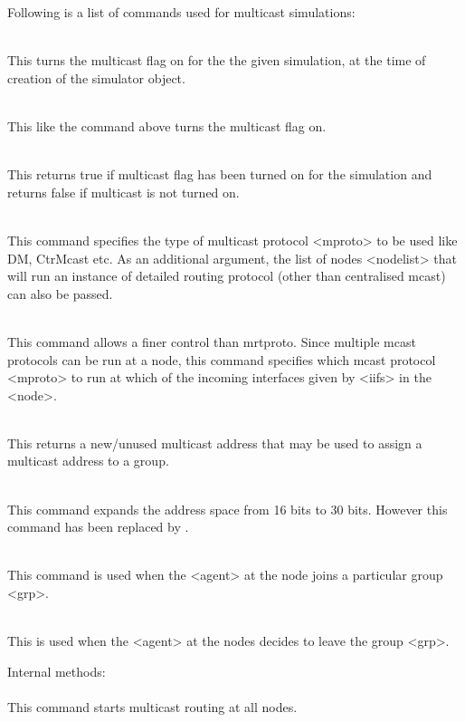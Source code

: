 Following is a list of commands used for multicast simulations:
\begin{flushleft}
\\
This turns the multicast flag on for the the given simulation, at the time of
creation of the simulator object.


\\
This like the command above turns the multicast flag on.


\\
This returns true if multicast flag has been turned on for the simulation
and returns false if multicast is not turned on.


\\
This command specifies the type of multicast protocol <mproto> to be used
like DM, CtrMcast etc. As an additional argument, the list of nodes <nodelist>
that will run an instance of detailed routing protocol (other than
centralised mcast) can also be passed.


\\
This command allows a finer control than mrtproto. Since multiple mcast
protocols can be run at a node, this command specifies which mcast protocol
<mproto> to run at which of the incoming interfaces given by <iifs> in the <node>.


\\
This returns a new/unused multicast address that may be used to assign a multicast
address to a group.


\\
This command expands the address space from 16 bits to 30 bits. However this
command has been replaced by .


\\
This command is used when the <agent> at the node joins a particular group <grp>.


\\
This is used when the <agent> at the nodes decides to leave the group <grp>.

Internal methods:\\

\\
This command starts multicast routing at all nodes. 



\end{flushleft}
